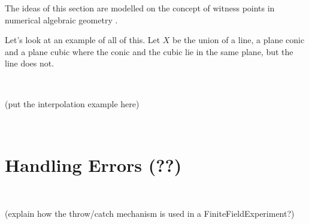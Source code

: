 \documentclass[12pt,a4paper]{amsart}
\theoremstyle{plain}
\theoremstyle{definition}
\begin{document}
The ideas of this section are modelled on the concept of witness points in numerical algebraic geometry \cite{??}.

Let's look at an example of all of this. Let $X$ be the union of a line, a plane conic and a plane cubic where the conic and the cubic lie in the same plane, but the line does not. 

\

{\color{red} (put the interpolation example here)}

\

\section{Handling Errors {\color{red} (??)}}

\

{\color{red} (explain how the throw/catch mechanism is used in a FiniteFieldExperiment?)}

\
\end{document}
